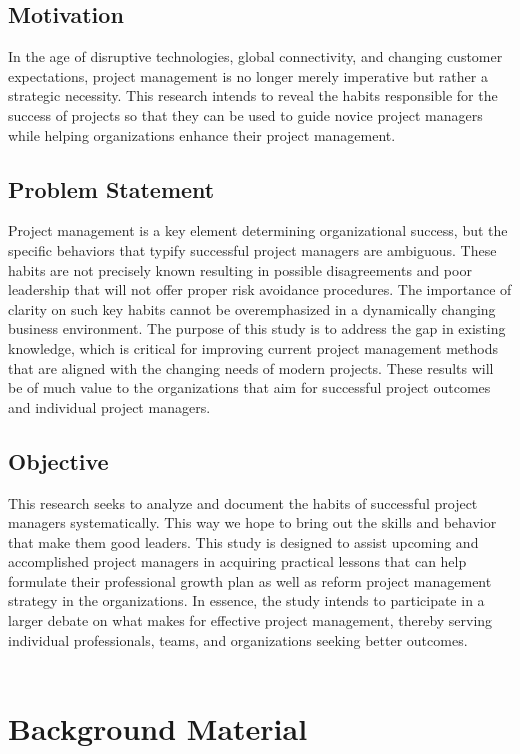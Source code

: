 \documentclass{article}
\begin{document}
\subsection{Motivation}
In the age of disruptive technologies, global connectivity, and changing customer expectations, project management is no longer merely imperative but rather a strategic necessity. This research intends to reveal the habits responsible for the success of projects so that they can be used to guide novice project managers while helping organizations enhance their project management.

\subsection{Problem Statement}
Project management is a key element determining organizational success, but the specific behaviors that typify successful project managers are ambiguous. These habits are not precisely known resulting in possible disagreements and poor leadership that will not offer proper risk avoidance procedures. The importance of clarity on such key habits cannot be overemphasized in a dynamically changing business environment. The purpose of this study is to address the gap in existing knowledge, which is critical for improving current project management methods that are aligned with the changing needs of modern projects. These results will be of much value to the organizations that aim for successful project outcomes and individual project managers.


\subsection{Objective}
This research seeks to analyze and document the habits of successful project managers systematically. This way we hope to bring out the skills and behavior that make them good leaders. This study is designed to assist upcoming and accomplished project managers in acquiring practical lessons that can help formulate their professional growth plan as well as reform project management strategy in the organizations. In essence, the study intends to participate in a larger debate on what makes for effective project management, thereby serving individual professionals, teams, and organizations seeking better outcomes.\\\\

\section{Background Material}
\end{document}
